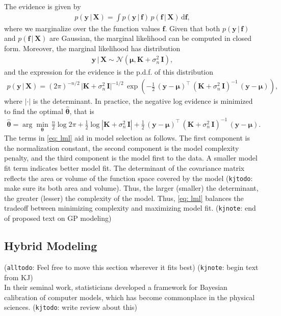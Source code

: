 \documentclass[journal=jacsat,manuscript=article]{achemso}
\newcommand{\kjnote}[1]{{\color{Blue} (\texttt{kjnote}: #1)}}
\newcommand{\kjtodo}[1]{{\color{Red} (\texttt{kjtodo}: #1)}}
\newcommand{\alltodo}[1]{{\color{Cyan} (\texttt{alltodo}: #1)}}
\newcommand{\xmatrix}{\ensuremath{\mathbf{X}}}
\begin{document}
The evidence is given by
\begin{gather*}
    p(\mathbf{y}\, | \, \xmatrix) = \int p(\mathbf{y}\, | \, \mathbf{f}) \,  p(\mathbf{f}\, | \, \xmatrix) \, \text{d}\mathbf{f},
\end{gather*}
where we marginalize over the the function values $\mathbf{f}$. Given that both $p(\mathbf{y}\, | \, \mathbf{f})$ and $ p(\mathbf{f}\, | \, \mathbf{X})$ are Gaussian, the marginal likelihood can be computed in closed form. Moreover, the marginal likelihood has distribution
\begin{gather*}
    \mathbf{y}\, | \, \mathbf{X} \sim \mathcal{N}(\boldsymbol{\mu}, \mathbf{K} + \sigma_n^2 \,\mathbf{I}),
\end{gather*}
and the expression for the evidence is the p.d.f. of this distribution
\begin{gather*}
    p(\mathbf{y}\, | \, \mathbf{X}) = (2\pi)^{-n/2}\,\vert \mathbf{K} + \sigma_n^2 \,\mathbf{I}\vert^{-1/2}\,\exp \left( -\frac{1}{2}\,(\mathbf{y}-\boldsymbol{\mu})^\intercal \, (\mathbf{K} + \sigma_n^2 \,\mathbf{I})^{-1}\,(\mathbf{y}-\boldsymbol{\mu})\right),
\end{gather*}
where $|\cdot|$ is the determinant. In practice, the negative log evidence is minimized to find the optimal $\hat{\boldsymbol{\theta}}$, that is
\begin{gather}
    \hat{\boldsymbol{\theta}} = \arg \min_{\boldsymbol{\theta}} \, \frac{n}{2}\log{2\pi} + \frac{1}{2}\log{|\mathbf{K} + \sigma_n^2 \,\mathbf{I}|} +  \frac{1}{2}\,(\mathbf{y}-\boldsymbol{\mu})^\intercal \, (\mathbf{K} + \sigma_n^2 \,\mathbf{I})^{-1}\,(\mathbf{y}-\boldsymbol{\mu}). \label{eq: lml}
\end{gather}
The terms in \eqref{eq: lml} aid in model selection as follows. The first component is the normalization constant, the second component is the model complexity penalty, and the third component is the model first to the data. A smaller model fit term indicates better model fit. The determinant of the covariance matrix reflects the area or volume of the function space covered by the model \kjtodo{make sure its both area and volume}. Thus, the larger (smaller) the determinant, the greater (lesser) the complexity of the model. Thus, \eqref{eq: lml} balances the tradeoff between minimizing complexity and maximizing model fit.
\kjnote{end of proposed text on GP modeling}


\subsection{Hybrid Modeling}
\alltodo{Feel free to move this section wherever it fits best}
\kjnote{begin text from KJ}\\
In their seminal work, statisticians \citeauthor{koh} \cite{koh} developed a framework for Bayesian calibration of computer models, which has become commonplace in the physical sciences. \kjtodo{write review about this}\\
\end{document}
